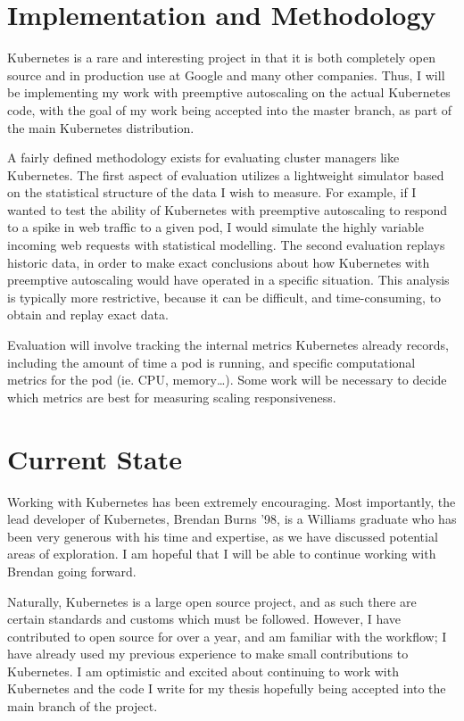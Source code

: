 \documentclass[letterpaper,11pt,twocolumn]{article}
\begin{document}
\section{Implementation and Methodology}

Kubernetes is a rare and interesting project in that it is both completely open
source and in production use at Google and many other
companies.\cite{google-container-engine} Thus, I will be implementing my work
with preemptive autoscaling on the actual Kubernetes code, with the goal of my
work being accepted into the master branch, as part of the main
Kubernetes distribution.

A fairly defined methodology exists for evaluating cluster managers like
Kubernetes.\cite[pg. 355]{omega} The first aspect of evaluation utilizes a
lightweight simulator based on the statistical structure of the data I wish to
measure. For example, if I wanted to test the ability of Kubernetes with
preemptive autoscaling to respond to a spike in web traffic to a given pod, I
would simulate the highly variable incoming web requests with statistical
modelling. The second evaluation replays historic data, in order to make exact
conclusions about how Kubernetes with preemptive autoscaling would have operated in a
specific situation. This analysis is typically more restrictive, because it can
be difficult, and time-consuming, to obtain and replay exact data.

Evaluation will involve tracking the internal metrics Kubernetes already
records, including the amount of time a pod is running, and specific
computational metrics for the pod (ie. CPU, memory\dots). Some work will be
necessary to decide which metrics are best for measuring scaling responsiveness.

\section{Current State}

Working with Kubernetes has been extremely encouraging. Most importantly,
the lead developer of Kubernetes, Brendan Burns '98, is a Williams graduate who has
been very generous with his time and expertise, as we have discussed potential
areas of exploration. I am hopeful that I will be able to continue
working with Brendan going forward.

Naturally, Kubernetes is a large open source project, and as such there are
certain standards and customs which must be followed.
However, I have contributed to open source for over a
year, and am familiar with the workflow; I have already used my previous experience to
make small contributions to Kubernetes. I am optimistic and excited about
continuing to work with Kubernetes and the code I write for my
thesis hopefully being accepted into the main branch of the project.



\end{document}
